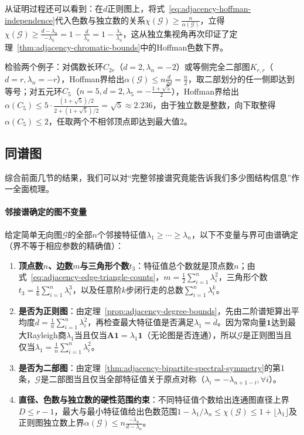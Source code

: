 从证明过程还可以看到：在$d$正则图上，将式~\eqref{eq:adjacency-hoffman-independence}代入色数与独立数的关系$\chi(\mathcal G)\geq\frac{n}{\alpha(\mathcal G)}$，立得$\chi(\mathcal G)\geq\frac{d-\lambda_n}{-\lambda_n}=1-\frac{d}{\lambda_n}=1-\frac{\lambda_1}{\lambda_n}$，这从独立集视角再次印证了定理~\ref{thm:adjacency-chromatic-bounds}中的Hoffman色数下界。

检验两个例子：对偶数长环$C_{2r}$（$d=2,\lambda_n=-2$）或等侧完全二部图$K_{r,r}$（$d=r,\lambda_n=-r$），Hoffman界给出$\alpha(\mathcal G)\leq n\frac{d}{2d}=\frac{n}{2}$，取二部划分的任一侧即达到等号；对五元环$C_5$（$n=5,d=2,\lambda_5=-\frac{1+\sqrt 5}{2}$），Hoffman界给出$\alpha(C_5)\leq 5\cdot\frac{(1+\sqrt 5)/2}{2+(1+\sqrt 5)/2}=\sqrt 5\approx 2.236$，由于独立数是整数，向下取整得$\alpha(C_5)\leq 2$，任取两个不相邻顶点即达到最大值$2$。

\subsection{同谱图}
\label{sec:adjacency-spectral-information}
\label{sec:adjacency-cospectral-graphs}

综合前面几节的结果，我们可以对“完整邻接谱究竟能告诉我们多少图结构信息”作一全面梳理。

\paragraph{邻接谱确定的图不变量}

给定简单无向图$\mathcal G$的全部$n$个邻接特征值$\lambda_1\ge\cdots\ge\lambda_n$，以下不变量与界可由谱确定（界不等于相应参数的精确值）：
\begin{enumerate}
\item \textbf{顶点数$n$、边数$m$与三角形个数$t_3$}：特征值总个数就是顶点数$n$；由式~\eqref{eq:adjacency-edge-triangle-counts}，$m=\frac12\sum_{i=1}^n\lambda_i^2$，三角形个数$t_3=\frac16\sum_{i=1}^n\lambda_i^3$，以及任意阶$k$步闭行走的总数$\sum_{i=1}^n\lambda_i^k$。
\item \textbf{是否为正则图}：由定理~\ref{prop:adjacency-degree-bounds}，先由二阶谱矩算出平均度$\overline d=\frac1n\sum_{i=1}^n\lambda_i^2$，再检查最大特征值是否满足$\lambda_1=\overline d$。因为常向量$\bm 1$达到最大Rayleigh商$\lambda_1$当且仅当$\bm A\bm 1=\lambda_1\bm 1$（无论图是否连通），所以$\mathcal G$是正则图当且仅当$\lambda_1=\frac1n\sum_{i=1}^n\lambda_i^2$。
\item \textbf{是否为二部图}：由定理~\ref{thm:adjacency-bipartite-spectral-symmetry}的第1条，$\mathcal G$是二部图当且仅当全部特征值关于原点对称（$\lambda_i=-\lambda_{n+1-i},\forall i$）。
\item \textbf{直径、色数与独立数的硬性范围约束}：不同特征值个数给出连通图直径上界$D\leq r-1$，最大与最小特征值给出色数范围$1-\lambda_1/\lambda_n\leq\chi(\mathcal G)\leq 1+\lfloor\lambda_1\rfloor$及正则图独立数上界$\alpha(\mathcal G)\leq n\frac{-\lambda_n}{d-\lambda_n}$。
\end{enumerate}

